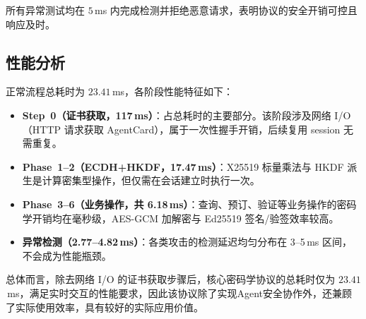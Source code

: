 所有异常测试均在 $5$\,ms 内完成检测并拒绝恶意请求，表明协议的安全开销可控且响应及时。

\subsection{性能分析}
正常流程总耗时为 $23.41$\,ms，各阶段性能特征如下：

\begin{itemize}[leftmargin=2em]
    \item \textbf{Step~0（证书获取，117\,ms）}：占总耗时的主要部分。该阶段涉及网络 I/O（HTTP 请求获取 AgentCard），属于一次性握手开销，后续复用 session 无需重复。
    \item \textbf{Phase~1--2（ECDH+HKDF，17.47\,ms）}：X25519 标量乘法与 HKDF 派生是计算密集型操作，但仅需在会话建立时执行一次。
    \item \textbf{Phase~3--6（业务操作，共 6.18\,ms）}：查询、预订、验证等业务操作的密码学开销均在毫秒级，AES-GCM 加解密与 Ed25519 签名/验签效率较高。
    \item \textbf{异常检测（2.77--4.82\,ms）}：各类攻击的检测延迟均匀分布在 3--5\,ms 区间，不会成为性能瓶颈。
\end{itemize}

总体而言，除去网络 I/O 的证书获取步骤后，核心密码学协议的总耗时仅为 $23.41$\,ms，满足实时交互的性能要求，因此该协议除了实现Agent安全协作外，还兼顾了实际使用效率，具有较好的实际应用价值。



